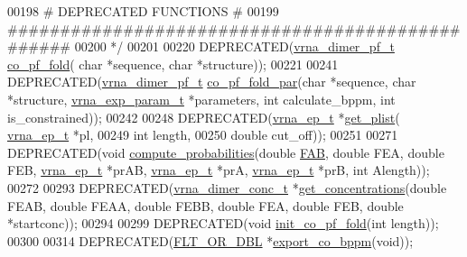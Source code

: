\begin{DoxyCode}
00198 \textcolor{comment}{# DEPRECATED FUNCTIONS                          #}
00199 \textcolor{comment}{#################################################}
00200 \textcolor{comment}{*/}
00201 
00220 DEPRECATED(\hyperlink{group__pf__cofold_structvrna__dimer__pf__s}{vrna\_dimer\_pf\_t} \hyperlink{part__func__co_8h_ae5c1e7331718669bdae7a86de2be6184}{co\_pf\_fold}( \textcolor{keywordtype}{char} *sequence, \textcolor{keywordtype}{char} *structure));
00221 
00241 DEPRECATED(\hyperlink{group__pf__cofold_structvrna__dimer__pf__s}{vrna\_dimer\_pf\_t} \hyperlink{part__func__co_8h_aabfc6cb6d02b8f08ac4c92f4f5b125d9}{co\_pf\_fold\_par}(\textcolor{keywordtype}{char} *sequence, \textcolor{keywordtype}{char} *structure, 
      \hyperlink{group__energy__parameters_structvrna__exp__param__s}{vrna\_exp\_param\_t} *parameters, \textcolor{keywordtype}{int} calculate\_bppm, \textcolor{keywordtype}{int} is\_constrained));
00242 
00248 DEPRECATED(\hyperlink{group__struct__utils_structvrna__elem__prob__s}{vrna\_ep\_t}  *\hyperlink{part__func__co_8h_afb35675f133966dc9f8a8c2c9686e13a}{get\_plist}( \hyperlink{group__struct__utils_structvrna__elem__prob__s}{vrna\_ep\_t} *pl,
00249                               \textcolor{keywordtype}{int} length,
00250                               \textcolor{keywordtype}{double} cut\_off));
00251 
00271 DEPRECATED(\textcolor{keywordtype}{void} \hyperlink{part__func__co_8h_a94c19120130e66a667a10a3c8598550c}{compute\_probabilities}(\textcolor{keywordtype}{double} \hyperlink{group__pf__cofold_a01a87f59db2b7fbf883b056e6f6c673a}{FAB}, \textcolor{keywordtype}{double} FEA, \textcolor{keywordtype}{double} FEB, 
      \hyperlink{group__struct__utils_structvrna__elem__prob__s}{vrna\_ep\_t}  *prAB, \hyperlink{group__struct__utils_structvrna__elem__prob__s}{vrna\_ep\_t}  *prA, \hyperlink{group__struct__utils_structvrna__elem__prob__s}{vrna\_ep\_t}  *prB, \textcolor{keywordtype}{int} Alength));
00272 
00293 DEPRECATED(\hyperlink{group__pf__cofold_structvrna__dimer__conc__s}{vrna\_dimer\_conc\_t} *\hyperlink{part__func__co_8h_a163159722a422ba90335a601fc34b8fb}{get\_concentrations}(\textcolor{keywordtype}{double} FEAB, \textcolor{keywordtype}{double} 
      FEAA, \textcolor{keywordtype}{double} FEBB, \textcolor{keywordtype}{double} FEA, \textcolor{keywordtype}{double} FEB, \textcolor{keywordtype}{double} *startconc));
00294 
00299 DEPRECATED(\textcolor{keywordtype}{void}   \hyperlink{part__func__co_8h_aa12dda9dd6179cdd22bcce87c0682c07}{init\_co\_pf\_fold}(\textcolor{keywordtype}{int} length));
00300 
00314 DEPRECATED(\hyperlink{group__data__structures_ga31125aeace516926bf7f251f759b6126}{FLT\_OR\_DBL} *\hyperlink{part__func__co_8h_ad94c0133157bed6912fe7fe866e0039e}{export\_co\_bppm}(\textcolor{keywordtype}{void}));

\end{DoxyCode}
